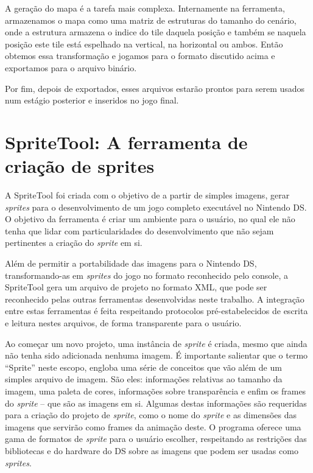 \documentclass[brazil]{abnt}
\begin{document}
A geração do mapa é a tarefa mais complexa. Internamente na ferramenta, armazenamos o mapa como uma matriz de estruturas do tamanho do cenário, onde a estrutura armazena o indice do tile daquela posição e também se naquela posição este tile está espelhado na vertical, na horizontal ou ambos. Então obtemos essa transformação e jogamos para o formato discutido acima e exportamos para o arquivo binário.

Por fim, depois de exportados, esses arquivos estarão prontos para serem usados num estágio posterior e inseridos no jogo final.

\section{SpriteTool: A ferramenta de criação de sprites}

A SpriteTool foi criada com o objetivo de a partir de simples imagens, gerar \textit{sprites} para o desenvolvimento de um jogo completo executável no Nintendo DS. O objetivo da ferramenta é criar um ambiente para o usuário, no qual ele não tenha que lidar com particularidades do desenvolvimento que não sejam pertinentes a criação do \textit{sprite} em si.

Além de permitir a portabilidade das imagens para o Nintendo DS, transformando-as em \textit{sprites} do jogo no formato reconhecido pelo console, a SpriteTool gera um arquivo de projeto no formato XML, que pode ser reconhecido pelas outras ferramentas desenvolvidas neste trabalho. A integração entre estas ferramentas é feita respeitando protocolos pré-estabelecidos de escrita e leitura nestes arquivos, de forma transparente para o usuário.

Ao começar um novo projeto, uma instância de \textit{sprite} é criada, mesmo que ainda não tenha sido adicionada nenhuma imagem. É importante salientar que o termo “Sprite” neste escopo, engloba uma série de conceitos que vão além de um simples arquivo de imagem. São eles: informações relativas ao tamanho da imagem, uma paleta de cores, informações sobre transparência e enfim os frames do \textit{sprite} – que são as imagens em si.
Algumas destas informações são requeridas para a criação do projeto de \textit{sprite}, como o nome do \textit{sprite} e as dimensões das imagens que servirão como frames da animação deste. O programa oferece uma gama de formatos de \textit{sprite} para o usuário escolher, respeitando as restrições das bibliotecas e do hardware do DS sobre as imagens que podem ser usadas como \textit{sprites}.
\end{document}
